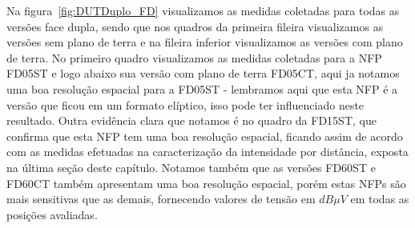 Na figura~\ref{fig:DUTDuplo_FD} visualizamos as medidas coletadas para todas as versões face dupla, sendo que nos quadros da primeira fileira visualizamos as versões sem plano de terra e na fileira inferior visualizamos as versões com plano de terra. No primeiro quadro visualizamos as medidas coletadas para a NFP FD05ST e logo abaixo sua versão com plano de terra FD05CT, aqui ja notamos uma boa resolução espacial para a FD05ST - lembramos aqui que esta NFP é a versão que ficou em um formato elíptico, isso pode ter influenciado neste resultado. Outra evidência clara que notamos é no quadro da FD15ST, que confirma que esta NFP tem uma boa resolução espacial, ficando assim de acordo com as medidas efetuadas na caracterização da intensidade por distância, exposta na última seção deste capítulo. Notamos também que as versões FD60ST e FD60CT também apresentam uma boa resolução espacial, porém estas NFPs são mais sensitivas que as demais, fornecendo valores de tensão em $dB \mu V$ em todas as posições avaliadas.



